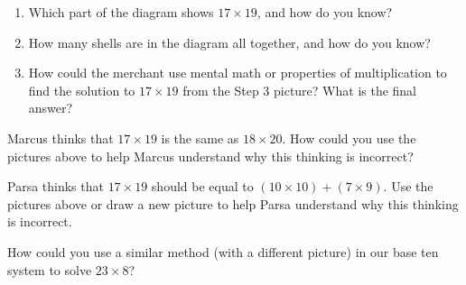 \documentclass[nooutcomes, noauthor]{ximera}
\begin{document}
\begin{problem}
\begin{enumerate}
	\item Which part of the diagram shows $17 \times 19$, and how do you know?
	\item How many shells are in the diagram all together, and how do you know?
	\item How could the merchant use mental math or properties of multiplication to find the solution to $17 \times 19$ from the Step 3 picture? What is the final answer?
\end{enumerate}
\end{problem}


\begin{problem}
Marcus thinks that $17 \times 19$ is the same as $18 \times 20$. How could you use the pictures above to help Marcus understand why this thinking is incorrect?
\end{problem}


\begin{problem}
Parsa thinks that $17 \times 19$ should be equal to $(10 \times 10) + (7 \times 9)$. Use the pictures above or draw a new picture to help Parsa understand why this thinking is incorrect.
\end{problem}


\begin{problem}
How could you use a similar method (with a different picture) in our base ten system to solve $23 \times 8$?
\end{problem}

\end{document}
